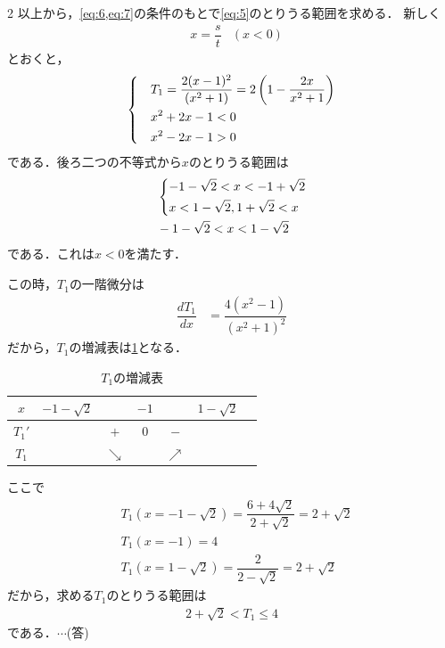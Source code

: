 \documentclass[../../main.tex]{subfiles}
\begin{document}
\begin{multicols}{2}
  以上から，\cref{eq:6,eq:7}の条件のもとで\cref{eq:5}のとりうる範囲を求める．
  新しく
  \begin{align}
    & x = \dfrac{s}{t} & (x<0)
  \end{align}
  とおくと，
  \begin{align}
    \begin{dcases}
      & T_1  = \dfrac{2(x-1)^2}{(x^2+1)} = 2\left(1-\dfrac{2x}{x^2+1}\right) \\
      & x^2 + 2x -1 < 0                                                    \\
      & x^2 - 2x -1 > 0
    \end{dcases}\label{eq:8}
  \end{align}
  である．後ろ二つの不等式から$x$のとりうる範囲は
  \begin{align}
    &
    \begin{dcases}
      -1 -\sqrt{2} < x < -1 + \sqrt{2} \\
      x < 1 - \sqrt{2}, 1+\sqrt{2} < x
    \end{dcases} \\
    &
    -1 -\sqrt{2} < x < 1 - \sqrt{2} \label{eq:9}
  \end{align}
  である．これは$x<0$を満たす．

  この時，$T_1$の一階微分は
  \begin{align}
    \dfrac{d T_1}{dx}
    & =\dfrac{4(x^2-1)}{(x^2+1)^2}
  \end{align}
  だから，$T_1$の増減表は\cref{1997-2:table:1}となる．

  \begin{table}[H]
    \centering
    \caption{$T_1$の増減表}
    \label{1997-2:table:1}
    \begin{tabular}{|c||c|c|c|c|c|c}
      \hline
      $x$    & $-1-\sqrt{2}$ &            & $-1$ &            & $1-\sqrt{2}$ \\
      \hline
      $T_1'$ &               & $+$        & $0$  & $-$        &              \\
      \hline
      $T_1$  &               & $\searrow$ &      & $\nearrow$ &              \\
      \hline
    \end{tabular}
  \end{table}

  ここで
  \begin{align}
    & T_1(x=-1-\sqrt{2}) = \dfrac{6+4\sqrt{2}}{2+\sqrt{2}} =  2+\sqrt{2} \\
    & T_1(x=-1)          = 4                                            \\
    & T_1(x=1-\sqrt{2})  = \dfrac{2}{2-\sqrt{2}} = 2+\sqrt{2}
  \end{align}
  だから，求める$T_1$のとりうる範囲は
  \begin{align}
    2+ \sqrt{2} < T_1 \leq 4
  \end{align}
  である．$\cdots$(答)


\end{multicols}
\end{document}
